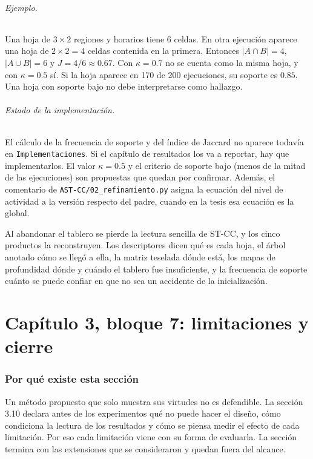 \documentclass[11pt,a4paper]{article}
\newenvironment{idea}{\par\begin{center}\begin{lrbox}{\ideabox}\begin{minipage}{0.9\linewidth}}{\end{minipage}\end{lrbox}\fcolorbox{blue!40!black}{blue!5}{\usebox{\ideabox}}\end{center}}
\begin{document}
\paragraph{Ejemplo.} Una hoja de $3\times2$ regiones y horarios tiene 6 celdas. En
otra ejecución aparece una hoja de $2\times2=4$ celdas contenida en la primera. Entonces
$|A\cap B|=4$, $|A\cup B|=6$ y $J=4/6\approx0.67$. Con $\kappa=0.7$ no se cuenta como la
misma hoja, y con $\kappa=0.5$ sí. Si la hoja aparece en 170 de 200 ejecuciones, su
soporte es $0.85$. Una hoja con soporte bajo no debe interpretarse como hallazgo.

\paragraph{Estado de la implementación.} El cálculo de la frecuencia de soporte y del
índice de Jaccard no aparece todavía en \texttt{Implementaciones}. Si el capítulo de
resultados los va a reportar, hay que implementarlos. El valor $\kappa=0.5$ y el
criterio de soporte bajo (menos de la mitad de las ejecuciones) son propuestas que
quedan por confirmar. Además, el comentario de \texttt{AST-CC/02\_refinamiento.py}
asigna la ecuación del nivel de actividad a la versión respecto del padre, cuando en la
tesis esa ecuación es la global.

\begin{idea}
Al abandonar el tablero se pierde la lectura sencilla de ST-CC, y los cinco productos
la reconstruyen. Los descriptores dicen qué es cada hoja, el árbol anotado cómo se
llegó a ella, la matriz teselada dónde está, los mapas de profundidad dónde y cuándo
el tablero fue insuficiente, y la frecuencia de soporte cuánto se puede confiar en
que no sea un accidente de la inicialización.
\end{idea}

\part{Capítulo 3, bloque 7: limitaciones y cierre}

\section{Por qué existe esta sección}

Un método propuesto que solo muestra sus virtudes no es defendible. La sección 3.10
declara antes de los experimentos qué no puede hacer el diseño, cómo condiciona la
lectura de los resultados y cómo se piensa medir el efecto de cada limitación. Por eso
cada limitación viene con su forma de evaluarla. La sección termina con las
extensiones que se consideraron y quedan fuera del alcance.
\end{document}
